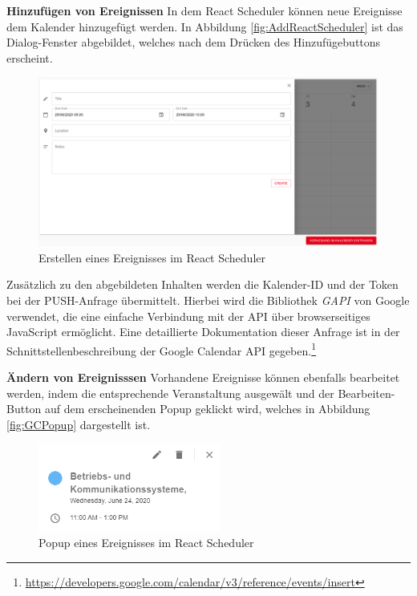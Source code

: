 \textbf{Hinzufügen von Ereignissen}\newline
In dem React Scheduler können neue Ereignisse dem Kalender hinzugefügt werden.
In Abbildung \vref{fig:AddReactScheduler} ist das Dialog-Fenster abgebildet, welches nach dem Drücken des Hinzufügebuttons erscheint.
\begin{figure}[H]
	\centering 
	\includegraphics[width=\textwidth]{img/FrontEnd/GCAdd.png}
	\caption[Erstellen eines Ereignisses im React Scheduler]{\label{fig:AddReactScheduler}Erstellen eines Ereignisses im React Scheduler}
\end{figure}

Zusätzlich zu den abgebildeten Inhalten werden die Kalender-ID und der Token bei der PUSH-Anfrage übermittelt. Hierbei wird die Bibliothek \textit{GAPI} von Google verwendet, die eine einfache Verbindung mit der \ac{API} über browserseitiges JavaScript ermöglicht. 
Eine detaillierte Dokumentation dieser Anfrage ist in der Schnittstellenbeschreibung der Google Calendar \ac{API} gegeben.\footnote{\url{https://developers.google.com/calendar/v3/reference/events/insert}}

\textbf{Ändern von Ereignisssen}\newline
Vorhandene Ereignisse können ebenfalls bearbeitet werden, indem die entsprechende Veranstaltung ausgewält und der Bearbeiten-Button auf dem erscheinenden Popup geklickt wird, welches in Abbildung \vref{fig:GCPopup} dargestellt ist. 
\begin{figure}[H]
	\centering 
	\includegraphics[width=6cm]{img/FrontEnd/GCPopup.png}
	\caption[Popup eines Ereignisses im React Scheduler]{\label{fig:GCPopup}Popup eines Ereignisses im React Scheduler}
\end{figure}

